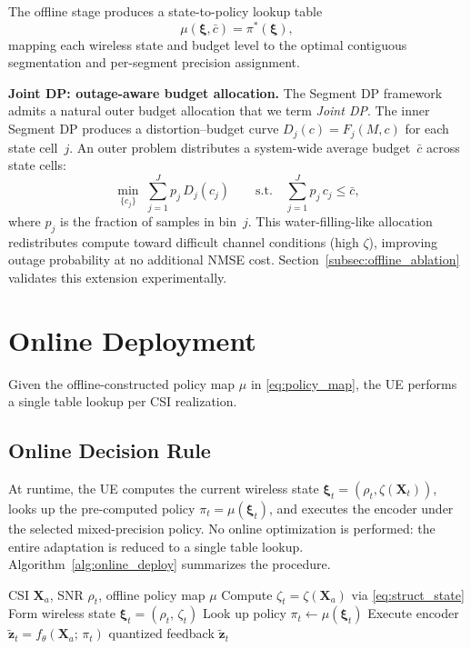 \documentclass[conference]{IEEEtran}
\begin{document}
The offline stage produces a state-to-policy lookup table
\begin{equation}
\mu(\boldsymbol{\xi}, \bar{c}) = \pi^*(\boldsymbol{\xi}),
\label{eq:policy_map}
\end{equation}
mapping each wireless state and budget level to the optimal contiguous segmentation and per-segment precision assignment.

\textbf{Joint DP: outage-aware budget allocation.}
The Segment DP framework admits a natural outer budget allocation that we term \emph{Joint DP}. The inner Segment DP produces a distortion--budget curve $D_j(c) = F_j(M,c)$ for each state cell~$j$. An outer problem distributes a system-wide average budget~$\bar{c}$ across state cells:
\begin{equation}
\min_{\{c_j\}}\;\sum_{j=1}^{J} p_j\, D_j(c_j)
\qquad\text{s.t.}\quad
\sum_{j=1}^{J} p_j\, c_j \le \bar{c},
\label{eq:outer}
\end{equation}
where $p_j$ is the fraction of samples in bin~$j$.
This water-filling-like allocation redistributes compute toward difficult channel conditions (high $\zeta$), improving outage probability at no additional NMSE cost. Section~\ref{subsec:offline_ablation} validates this extension experimentally.

\section{Online Deployment}
\label{sec:online}

Given the offline-constructed policy map $\mu$ in \eqref{eq:policy_map}, the UE performs a single table lookup per CSI realization.

\subsection{Online Decision Rule}
\label{subsec:online_rule}

At runtime, the UE computes the current wireless state $\boldsymbol{\xi}_t=(\rho_t,\zeta(\mathbf{X}_t))$, looks up the pre-computed policy $\pi_t=\mu(\boldsymbol{\xi}_t)$, and executes the encoder under the selected mixed-precision policy.
No online optimization is performed: the entire adaptation is reduced to a single table lookup.
Algorithm~\ref{alg:online_deploy} summarizes the procedure.

\begin{algorithm}[t]
\caption{Online Policy Deployment}
\label{alg:online_deploy}
\begin{algorithmic}[1]
\REQUIRE CSI $\mathbf{X}_a$, SNR $\rho_t$, offline policy map $\mu$
\STATE Compute $\zeta_t = \zeta(\mathbf{X}_a)$ via \eqref{eq:struct_state}
\STATE Form wireless state $\boldsymbol{\xi}_t = (\rho_t,\, \zeta_t)$
\STATE Look up policy $\pi_t \leftarrow \mu(\boldsymbol{\xi}_t)$
\STATE Execute encoder $\tilde{\mathbf{z}}_t = f_\theta(\mathbf{X}_a;\, \pi_t)$
\RETURN quantized feedback $\tilde{\mathbf{z}}_t$
\end{algorithmic}
\end{algorithm}
\end{document}

